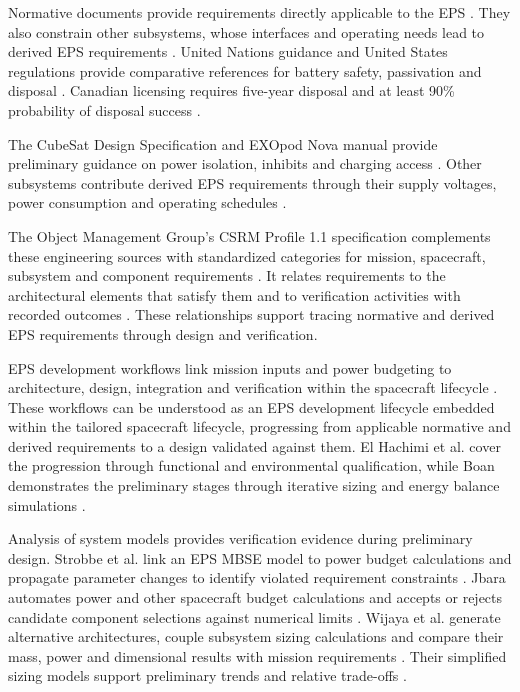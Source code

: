 Normative documents provide requirements directly applicable to the EPS \citep[Sec.~2.3]{calpoly2022cds}.
They also constrain other subsystems, whose interfaces and operating needs lead to derived EPS requirements \citep[Secs.~4.2--4.3]{nasa2016systems}.
United Nations guidance and United States regulations provide comparative references for battery safety, passivation and disposal \citep{unoosa2010debris,fcc2026satellitecommunications}.
Canadian licensing requires five-year disposal and at least 90\% probability of disposal success \citep[Decisions~D10--D11]{ised2026debris}.

The CubeSat Design Specification and EXOpod Nova manual provide preliminary guidance on power isolation, inhibits and charging access \citep{calpoly2022cds,exolaunch2024exopodnova}.
Other subsystems contribute derived EPS requirements through their supply voltages, power consumption and operating schedules \citep[Secs.~2--4]{handpicked-0003}\citep[Sec.~2]{review-0289}.

The Object Management Group's CSRM Profile 1.1 specification complements these engineering sources with standardized categories for mission, spacecraft, subsystem and component requirements \citep[Sec.~6.1]{omg2025csrm}.
It relates requirements to the architectural elements that satisfy them and to verification activities with recorded outcomes \citep[Secs.~6.3--6.4]{omg2025csrm}.
These relationships support tracing normative and derived EPS requirements through design and verification.

EPS development workflows link mission inputs and power budgeting to architecture, design, integration and verification within the spacecraft lifecycle \citep{handpicked-0003,review-0289}.
These workflows can be understood as an EPS development lifecycle embedded within the tailored spacecraft lifecycle, progressing from applicable normative and derived requirements to a design validated against them.
El Hachimi et al. cover the progression through functional and environmental qualification, while Boan demonstrates the preliminary stages through iterative sizing and energy balance simulations \citep[Secs.~2--5]{handpicked-0003}\citep[Secs.~2--4]{review-0289}.

Analysis of system models provides verification evidence during preliminary design.
Strobbe et al. link an EPS MBSE model to power budget calculations and propagate parameter changes to identify violated requirement constraints \citep[Secs.~III--IV]{review-0764}.
Jbara automates power and other spacecraft budget calculations and accepts or rejects candidate component selections against numerical limits \citep[Secs.~4--5]{review-0270}.
Wijaya et al. generate alternative architectures, couple subsystem sizing calculations and compare their mass, power and dimensional results with mission requirements \citep[Sec.~5.2]{review-0055}.
Their simplified sizing models support preliminary trends and relative trade-offs \citep[Sec.~6.1]{review-0055}.

